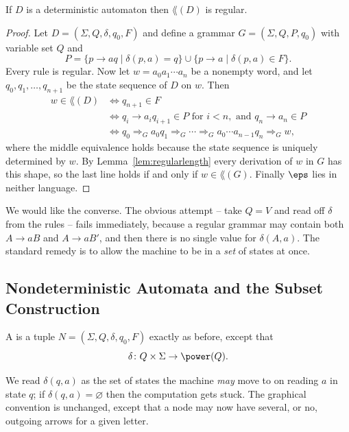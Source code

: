 \begin{theorem}\label{thm:dfatogrammar}
	If $D$ is a deterministic automaton then $\lang(D)$ is regular.
\end{theorem}

\begin{proof}
	Let $D = (\Sigma, Q, \delta, q_0, F)$ and define a grammar $G = (\Sigma, Q, P, q_0)$ with variable set $Q$ and
	$$P = \{p \to aq \mid \delta(p,a) = q\} \cup \{p \to a \mid \delta(p,a) \in F\}.$$
	Every rule is regular. Now let $w = a_0a_1\cdots a_n$ be a nonempty word, and let $q_0, q_1, \dots, q_{n+1}$ be the state sequence of $D$ on $w$. Then
	\begin{align*}
		w \in \lang(D) &\iff q_{n+1} \in F \\
		&\iff q_i \to a_iq_{i+1} \in P \text{ for } i < n, \text{ and } q_n \to a_n \in P \\
		&\iff q_0 \Rightarrow_G a_0q_1 \Rightarrow_G \cdots \Rightarrow_G a_0\cdots a_{n-1}q_n \Rightarrow_G w,
	\end{align*}
	where the middle equivalence holds because the state sequence is uniquely determined by $w$. By Lemma~\ref{lem:regularlength} every derivation of $w$ in $G$ has this shape, so the last line holds if and only if $w \in \lang(G)$. Finally $\eps$ lies in neither language.
\end{proof}

We would like the converse. The obvious attempt -- take $Q = V$ and read off $\delta$ from the rules -- fails immediately, because a regular grammar may contain both $A \to aB$ and $A \to aB'$, and then there is no single value for $\delta(A,a)$. The standard remedy is to allow the machine to be in a \emph{set} of states at once.

\subsection{Nondeterministic Automata and the Subset Construction}

\begin{definition}
	A  is a tuple $N = (\Sigma, Q, \delta, q_0, F)$ exactly as before, except that
	$$\delta \colon Q \times \Sigma \to \power(Q).$$
\end{definition}

We read $\delta(q,a)$ as the set of states the machine \emph{may} move to on reading $a$ in state $q$; if $\delta(q,a) = \varnothing$ then the computation gets stuck. The graphical convention is unchanged, except that a node may now have several, or no, outgoing arrows for a given letter.

